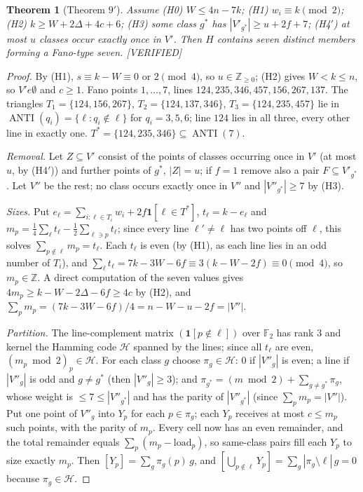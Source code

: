 \documentclass[11pt]{article}
\newtheorem{theorem}{Theorem}[section]
\theoremstyle{definition}
\newcommand{\st}[1]{\textsf{\small[#1]}}
\newcommand{\F}{\mathbb{F}_2}
\DeclareMathOperator{\ANTI}{ANTI}
\begin{document}
\begin{theorem}[Theorem $9'$]\label{thm:9}
Assume (H0) $W\le4n-7k$; (H1) $w_i\equiv k\pmod2$; (H2) $k\ge W+2\Delta+4c+6$; (H3) some class $g^*$ has
$|V'_{g^*}|\ge u+2f+7$; (H4$'$) at most $u$ classes occur exactly once in $V'$. Then $H$ contains seven distinct
members forming a Fano-type seven. \st{VERIFIED}
\end{theorem}
\begin{proof}
By (H1), $s\equiv k-W\equiv0$ or $2\pmod 4$, so $u\in\mathbb Z_{\ge0}$; (H2) gives $W<k\le n$, so $V'
e\emptyset$ and $c\ge1$. Fano points $1,\dots,7$, lines
$124,235,346,457,156,267,137$. The triangles $T_1=\{124,156,267\}$, $T_2=\{124,137,346\}$, $T_3=\{124,235,457\}$ lie in
$\ANTI(q_i)=\{\ell:q_i\notin\ell\}$ for $q_i=3,5,6$; line $124$ lies in all three, every other line in exactly one.
$T^*=\{124,235,346\}\subseteq\ANTI(7)$.

\emph{Removal.} Let $Z\subseteq V'$ consist of the points of classes occurring once in $V'$ (at most $u$, by (H4$'$))
and further points of $g^*$, $|Z|=u$; if $f=1$ remove also a pair $F\subseteq V'_{g^*}$. Let $V''$ be the rest; no class
occurs exactly once in $V''$ and $|V''_{g^*}|\ge7$ by (H3).

\emph{Sizes.} Put $e_\ell=\sum_{i:\ell\in T_i}w_i+2f\mathbf 1[\ell\in T^*]$, $t_\ell=k-e_\ell$ and
$m_p=\tfrac14\sum_\ell t_\ell-\tfrac12\sum_{\ell\ni p}t_\ell$; since every line $\ell'\ne\ell$ has two points off $\ell$,
this solves $\sum_{p\notin\ell}m_p=t_\ell$. Each $t_\ell$ is even (by (H1), as each line lies in an odd number of
$T_i$), and $\sum_\ell t_\ell=7k-3W-6f\equiv3(k-W-2f)\equiv0\pmod4$, so $m_p\in\mathbb Z$. A direct computation of the
seven values gives $4m_p\ge k-W-2\Delta-6f\ge4c$ by (H2), and $\sum_pm_p=(7k-3W-6f)/4=n-W-u-2f=|V''|$.

\emph{Partition.} The line-complement matrix $(\mathbf 1[p\notin\ell])$ over $\F$ has rank $3$ and kernel the Hamming
code $\mathcal H$ spanned by the lines; since all $t_\ell$ are even, $(m_p\bmod2)_p\in\mathcal H$. For each class $g$
choose $\pi_g\in\mathcal H$: $0$ if $|V''_g|$ is even; a line if $|V''_g|$ is odd and $g\ne g^*$ (then $|V''_g|\ge3$);
and $\pi_{g^*}=(m\bmod2)+\sum_{g\ne g^*}\pi_g$, whose weight is $\le7\le|V''_{g^*}|$ and has the parity of
$|V''_{g^*}|$ (since $\sum_pm_p=|V''|$). Put one point of $V''_g$ into $Y_p$ for each $p\in\pi_g$; each $Y_p$ receives at
most $c\le m_p$ such points, with the parity of $m_p$. Every cell now has an even remainder, and the total remainder
equals $\sum_p(m_p-\text{load}_p)$, so same-class pairs fill each $Y_p$ to size exactly $m_p$. Then
$[Y_p]=\sum_g\pi_g(p)\,g$, and $[\bigcup_{p\notin\ell}Y_p]=\sum_g|\pi_g\setminus\ell|\,g=0$ because $\pi_g\in\mathcal H$.


\end{proof}
\end{document}
